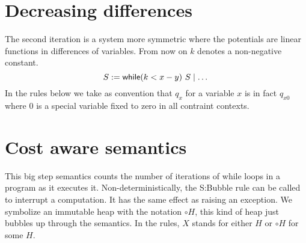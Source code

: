 \documentclass[10pt]{article}
\theoremstyle{newstyle}
\begin{document}
\section{Decreasing differences}
The second iteration is a system more symmetric where the potentials
are linear functions in differences of variables.  From now on $k$
denotes a non-negative constant.
$$
S := \mathsf{while}(k < x - y)~S \mid \dots
$$
%
In the rules below we take as convention that $q_{x}$ for a variable
$x$ is in fact $q_{x0}$ where 0 is a special variable fixed to zero
in all contraint contexts.


\section{Cost aware semantics}

This big step semantics counts the number of iterations of
while loops in a program as it executes it.  Non-deterministically,
the {\sc S:Bubble} rule can be called to interrupt a computation.
It has the same effect as raising an exception.  We symbolize an
immutable heap with the notation $\circ H$, this kind of heap just
bubbles up through the semantics. In the rules, $X$ stands for
either $H$ or $\circ H$ for some $H$.
\end{document}
